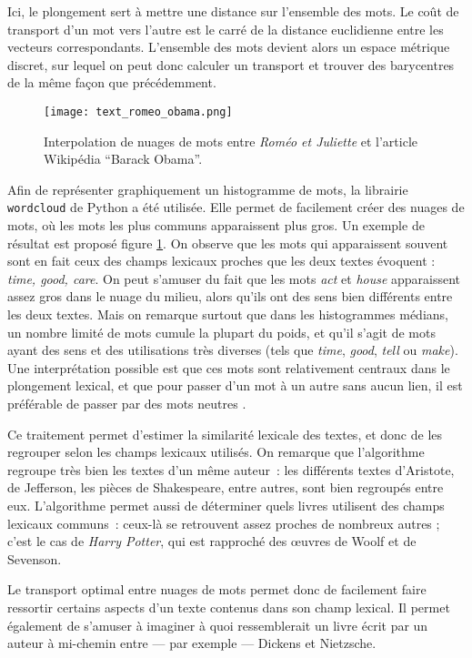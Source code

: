 Ici, le plongement sert à mettre une distance sur l'ensemble des mots. Le coût de transport d'un mot vers l'autre est le carré de la distance euclidienne entre les vecteurs correspondants. L'ensemble des mots devient alors un espace métrique discret, sur lequel on peut donc calculer un transport et trouver des barycentres de la même façon que précédemment.

\begin{figure}
\centering
\texttt{[image: text\_romeo\_obama.png]}
\caption{Interpolation de nuages de mots entre \emph{Roméo et Juliette} et l'article Wikipédia ``Barack Obama''.}
\label{fig:romeo_obama}
\end{figure}

Afin de représenter graphiquement un histogramme de mots, la librairie \texttt{wordcloud} de Python a été utilisée. Elle permet de facilement créer des nuages de mots, où les mots les plus communs apparaissent plus gros.
Un exemple de résultat est proposé figure \ref{fig:romeo_obama}.
On observe que les mots qui apparaissent souvent sont en fait ceux des champs lexicaux proches que les deux textes évoquent : \emph{time, good, care}.
On peut s'amuser du fait que les mots \emph{act} et \emph{house} apparaissent assez gros dans le nuage du milieu, alors qu'ils ont des sens bien différents entre les deux textes.
Mais on remarque surtout que dans les histogrammes médians, un nombre limité de mots cumule la plupart du poids, et qu'il s'agit de mots ayant des sens et des utilisations très diverses (tels que \emph{time}, \emph{good}, \emph{tell} ou \emph{make}).
Une interprétation possible est que ces mots sont relativement centraux dans le plongement lexical, et que pour passer d'un mot à un autre sans aucun lien, il est préférable de passer par des mots \og neutres \fg.

Ce traitement permet d'estimer la similarité lexicale des textes, et donc de les regrouper selon les champs lexicaux utilisés. On remarque que l'algorithme regroupe très bien les textes d'un même auteur~: les différents textes d'Aristote, de Jefferson, les pièces de Shakespeare, entre autres, sont bien regroupés entre eux. L'algorithme permet aussi de déterminer quels livres utilisent des champs lexicaux communs~: ceux-là se retrouvent assez proches de nombreux autres ; c'est le cas de \emph{Harry Potter}, qui est rapproché des \oe uvres de Woolf et de Sevenson.

Le transport optimal entre nuages de mots permet donc de facilement faire ressortir certains aspects d'un texte contenus dans son champ lexical.
Il permet également de s'amuser à imaginer à quoi ressemblerait un livre écrit par un auteur à mi-chemin entre --- par exemple --- Dickens et Nietzsche.


